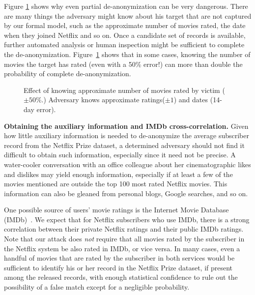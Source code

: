 \documentclass[11pt]{article}
\begin{document}
Figure \ref{fig:clp} shows why even partial de-anonymization can be very
dangerous.  There are many things the adversary might know about his
target that are not captured by our formal model, such as the approximate
number of movies rated, the date when they joined Netflix and so on.
Once a candidate set of records is available, further automated analysis
or human inspection might be sufficient to complete the de-anonymization.
Figure~\ref{fig:clp} shows that in some cases, knowing the number of
movies the target has rated (even with a 50\% error!) can more than
double the probability of complete de-anonymization.

\begin{figure}
\begin{minipage}[b]{0.47\linewidth} %
\centering
\mbox{}
\caption{Entropic de-anonymization: 
same parameters as in Figure~\ref{fig:ere}.\label{fig:nde}}
\end{minipage}
\hspace{.5cm} %
\begin{minipage}[b]{0.47\linewidth}
\centering
\mbox{}
\caption{Effect of knowing approximate number of movies rated by victim
($\pm 50\%$.)  Adversary knows approximate ratings($\pm 1$) and dates
(14-day error).\label{fig:clp}}
\end{minipage}
\end{figure}


\vspace{1ex}
\noindent
\textbf{Obtaining the auxiliary information and IMDb cross-correlation.}
\label{imdb}
Given how little auxiliary information is needed to de-anonymize the
average subscriber record from the Netflix Prize dataset, a determined
adversary should not find it difficult to obtain such information,
especially since it need not be precise.  A water-cooler conversation with
an office colleague about her cinematographic likes and dislikes may yield
enough information, especially if at least a few of the movies mentioned
are outside the top 100 most rated Netflix movies.  This information
can also be gleaned from personal blogs, Google searches, and so on.

One possible source of users' movie ratings is the Internet Movie Database
(IMDb)~\cite{imdb}.  We expect that for Netflix subscribers who use IMDb,
there is a strong correlation between their private Netflix ratings and
their public IMDb ratings.  Note that our attack does \emph{not} require
that all movies rated by the subscriber in the Netflix system be also
rated in IMDb, or vice versa.  In many cases, even a handful of movies
that are rated by the subscriber in both services would be sufficient
to identify his or her record in the Netflix Prize dataset, if present
among the released records, with enough statistical confidence to rule
out the possibility of a false match except for a negligible probability.
\end{document}
